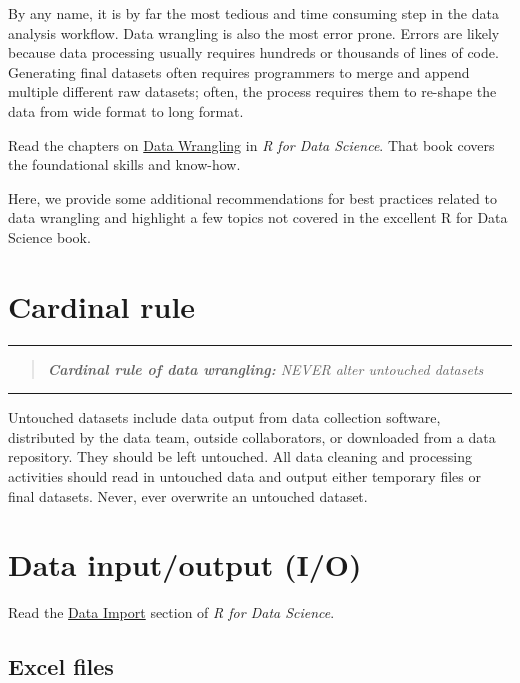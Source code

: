 \documentclass[
]{book}
\begin{document}
By any name, it is by far the most tedious and time consuming step in the data analysis workflow. Data wrangling is also the most error prone. Errors are likely because data processing usually requires hundreds or thousands of lines of code. Generating final datasets often requires programmers to merge and append multiple different raw datasets; often, the process requires them to re-shape the data from wide format to long format.

Read the chapters on \href{https://r4ds.had.co.nz/}{Data Wrangling} in \emph{R for Data Science}. That book covers the foundational skills and know-how.

Here, we provide some additional recommendations for best practices related to data wrangling and highlight a few topics not covered in the excellent R for Data Science book.

\section{Cardinal rule}\label{cardinal-rule}

\begin{center}\rule{0.5\linewidth}{0.5pt}\end{center}

\begin{quote}
\emph{\textbf{Cardinal rule of data wrangling:} NEVER alter untouched datasets}
\end{quote}

\begin{center}\rule{0.5\linewidth}{0.5pt}\end{center}

Untouched datasets include data output from data collection software, distributed by the data team, outside collaborators, or downloaded from a data repository. They should be left untouched. All data cleaning and processing activities should read in untouched data and output either temporary files or final datasets. Never, ever overwrite an untouched dataset.

\section{Data input/output (I/O)}\label{data-inputoutput-io}

Read the \href{https://r4ds.had.co.nz/data-import.html}{Data Import} section of \emph{R for Data Science}.

\subsection{Excel files}\label{excel-files}
\end{document}
